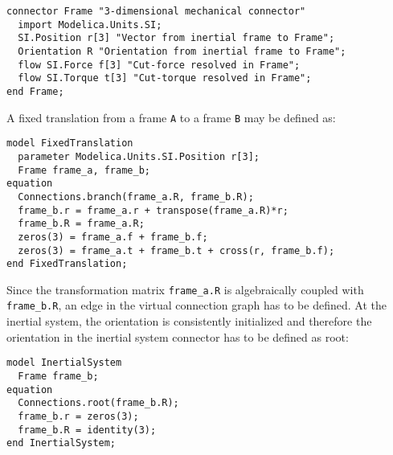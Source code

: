 \begin{nonnormative}
\begin{lstlisting}[language=modelica]
connector Frame "3-dimensional mechanical connector"
  import Modelica.Units.SI;
  SI.Position r[3] "Vector from inertial frame to Frame";
  Orientation R "Orientation from inertial frame to Frame";
  flow SI.Force f[3] "Cut-force resolved in Frame";
  flow SI.Torque t[3] "Cut-torque resolved in Frame";
end Frame;
\end{lstlisting}
A fixed translation from a frame \lstinline!A! to a frame \lstinline!B! may be defined as:
\begin{lstlisting}[language=modelica]
model FixedTranslation
  parameter Modelica.Units.SI.Position r[3];
  Frame frame_a, frame_b;
equation
  Connections.branch(frame_a.R, frame_b.R);
  frame_b.r = frame_a.r + transpose(frame_a.R)*r;
  frame_b.R = frame_a.R;
  zeros(3) = frame_a.f + frame_b.f;
  zeros(3) = frame_a.t + frame_b.t + cross(r, frame_b.f);
end FixedTranslation;
\end{lstlisting}
Since the transformation matrix \lstinline!frame_a.R! is algebraically coupled with \lstinline!frame_b.R!, an edge in the virtual connection graph has to be defined.
At the inertial system, the orientation is consistently initialized and therefore the orientation in the inertial system connector has to be defined as root:
\begin{lstlisting}[language=modelica]
model InertialSystem
  Frame frame_b;
equation
  Connections.root(frame_b.R);
  frame_b.r = zeros(3);
  frame_b.R = identity(3);
end InertialSystem;
\end{lstlisting}
\end{nonnormative}
